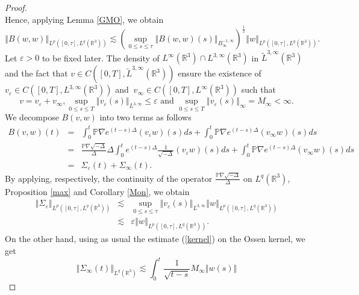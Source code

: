 \documentclass[10pt,a4paper]{amsart}
\begin{document}
\begin{proof}
\[\]%
Hence, applying Lemma \ref{GMO}, we obtain
\begin{equation}
\left\Vert B(w,w)\right\Vert _{L^{p}([0,\tau ],L^{q}(\mathbb{R}%
^{3}))}\lesssim \left(\sup_{0\leq s\leq \tau }\left\Vert B(w,w)(s)\right\Vert
_{B_{\infty }^{-1,\infty }}\right)^\frac{1}{2}\left\Vert w\right\Vert _{L^{p}([0,\tau ],L^{q}(%
\mathbb{R}^{3}))}.  \label{Est3}
\end{equation}%
Let $\varepsilon >0$ to be fixed later. The density of $L^{\infty }(%
\mathbb{R}^{3})\cap L^{3,\infty }(\mathbb{R}^{3})$ in $\tilde{L}^{3,\infty }(%
\mathbb{R}^{3})$ and the fact that $v\in C([0,T],\tilde{L}^{3,\infty }(%
\mathbb{R}^{3}))$ ensure the existence of $v_{\varepsilon }\in
C([0,T],L^{3,\infty }(\mathbb{R}^{3}))$ and $~v_{\infty }\in
C([0,T],L^{\infty }(\mathbb{R}^{3}))$ such that
\[
v=v_{\varepsilon }+v_{\infty },\sup_{0\leq s\leq T}\left\Vert v_{\varepsilon
}(s)\right\Vert _{L^{3,\infty }}\leq \varepsilon \text{ and }\sup_{0\leq
s\leq T}\left\Vert v_{\varepsilon }(s)\right\Vert _{\infty }=M_{\infty
}<\infty .
\]%
We decompose $B(v,w)$ into two terms as follows
\begin{eqnarray*}
B(v,w)(t)&=&
\int_{0}^{t} \mathbb{P}\nabla e^{(t-s)\Delta }(v_{\varepsilon
}w)(s)ds+\int_{0}^{t}\mathbb{P}\nabla e^{(t-s)\Delta }(v_{\infty
}w)(s)ds\\
&=& \frac{\mathbb{P}\nabla\sqrt{-\Delta }}{\Delta }
\Delta \int_{0}^{t}e^{(t-s)\Delta }\frac{1}{\sqrt{-\Delta }}(v_{\varepsilon
}w)(s)ds+\int_{0}^{t}\mathbb{P}\nabla e^{(t-s)\Delta }(v_{\infty
}w)(s)ds\\
&=& \Sigma_{\varepsilon}(t)+\Sigma_{\infty }(t).
\end{eqnarray*}
By applying, respectively,  the continuity of the operator $\frac{\mathbb{P}\nabla\sqrt{-\Delta }}{\Delta}$ on $ L^{q}(\mathbb{R}^{3})$, Proposition \ref{max} and Corollary \ref{Mon},  we obtain
\begin{eqnarray}
\left\Vert \Sigma_{\varepsilon}\right\Vert _{L^{p}([0,\tau ],L^{q}(\mathbb{R}%
^{3}))} &\lesssim &\sup_{0\leq s\leq \tau }\left\Vert v_{\varepsilon
}(s)\right\Vert _{L^{3,\infty }}\left\Vert w\right\Vert _{L^{p}([0,\tau
],L^{q}(\mathbb{R}^{3}))}  \nonumber \\
&\lesssim &\varepsilon \left\Vert w\right\Vert _{L^{p}([0,\tau ],L^{q}(%
\mathbb{R}^{3}))}.  \label{Est2}
\end{eqnarray}%
On the other hand, using as usual the estimate (\ref{kernel}) on the Ossen kernel, we get
\[\left\Vert \Sigma_{\infty }(t)\right\Vert _{L^{q}(\mathbb{R}^{3})} \lesssim
\int_{0}^{t}\frac{1}{\sqrt{t-s}}M_{\infty }\left\Vert w(s)\right\Vert
\]
\end{proof}
\end{document}
